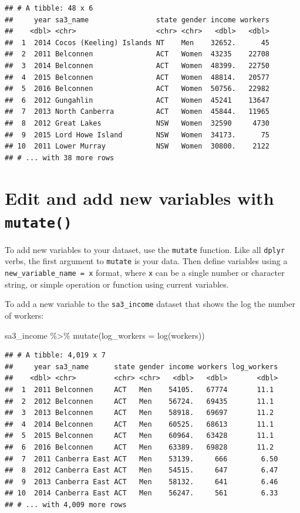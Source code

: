 \documentclass[
]{book}
\newenvironment{Shaded}{\begin{snugshade}}{\end{snugshade}}
\newcommand{\AttributeTok}[1]{\textcolor[rgb]{0.77,0.63,0.00}{#1}}
\newcommand{\FunctionTok}[1]{\textcolor[rgb]{0.00,0.00,0.00}{#1}}
\newcommand{\NormalTok}[1]{#1}
\newcommand{\SpecialCharTok}[1]{\textcolor[rgb]{0.00,0.00,0.00}{#1}}
\begin{document}
\begin{verbatim}
## # A tibble: 48 x 6
##     year sa3_name                state gender income workers
##    <dbl> <chr>                   <chr> <chr>   <dbl>   <dbl>
##  1  2014 Cocos (Keeling) Islands NT    Men    32652.      45
##  2  2011 Belconnen               ACT   Women  43235    22708
##  3  2014 Belconnen               ACT   Women  48399.   22750
##  4  2015 Belconnen               ACT   Women  48814.   20577
##  5  2016 Belconnen               ACT   Women  50756.   22982
##  6  2012 Gungahlin               ACT   Women  45241    13647
##  7  2013 North Canberra          ACT   Women  45844.   11965
##  8  2012 Great Lakes             NSW   Women  32590     4730
##  9  2015 Lord Howe Island        NSW   Women  34173.      75
## 10  2011 Lower Murray            NSW   Women  30800.    2122
## # ... with 38 more rows
\end{verbatim}

\hypertarget{edit-and-add-new-variables-with-mutate}{%
\section{\texorpdfstring{Edit and add new variables with \texttt{mutate()}}{Edit and add new variables with mutate()}}\label{edit-and-add-new-variables-with-mutate}}

To add new variables to your dataset, use the \texttt{mutate} function. Like all \texttt{dplyr} verbs, the first argument to \texttt{mutate} is your data. Then define variables using a \texttt{new\_variable\_name\ =\ x} format, where \texttt{x} can be a single number or character string, or simple operation or function using current variables.

To add a new variable to the \texttt{sa3\_income} dataset that shows the log the number of workers:

\begin{Shaded}
\begin{Highlighting}[]
\NormalTok{sa3\_income }\SpecialCharTok{\%\textgreater{}\%} 
  \FunctionTok{mutate}\NormalTok{(}\AttributeTok{log\_workers =} \FunctionTok{log}\NormalTok{(workers))}
\end{Highlighting}
\end{Shaded}

\begin{verbatim}
## # A tibble: 4,019 x 7
##     year sa3_name      state gender income workers log_workers
##    <dbl> <chr>         <chr> <chr>   <dbl>   <dbl>       <dbl>
##  1  2011 Belconnen     ACT   Men    54105.   67774       11.1 
##  2  2012 Belconnen     ACT   Men    56724.   69435       11.1 
##  3  2013 Belconnen     ACT   Men    58918.   69697       11.2 
##  4  2014 Belconnen     ACT   Men    60525.   68613       11.1 
##  5  2015 Belconnen     ACT   Men    60964.   63428       11.1 
##  6  2016 Belconnen     ACT   Men    63389.   69828       11.2 
##  7  2011 Canberra East ACT   Men    53139.     666        6.50
##  8  2012 Canberra East ACT   Men    54515.     647        6.47
##  9  2013 Canberra East ACT   Men    58132.     641        6.46
## 10  2014 Canberra East ACT   Men    56247.     561        6.33
## # ... with 4,009 more rows
\end{verbatim}
\end{document}
